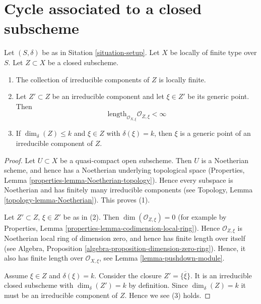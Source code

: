 \section{Cycle associated to a closed subscheme}
\label{section-cycle-of-closed-subscheme}

\begin{lemma}
\label{lemma-multiplicity-finite}
Let $(S, \delta)$ be as in Sitation \ref{situation-setup}.
Let $X$ be locally of finite type over $S$.
Let $Z \subset X$ be a closed subscheme.
\begin{enumerate}
\item The collection of irreducible components of $Z$
is locally finite.
\item Let $Z' \subset Z$ be an irreducible component and
let $\xi \in Z'$ be its generic point.
Then
$$
\text{length}_{\mathcal{O}_{X, \xi}} \mathcal{O}_{Z, \xi} < \infty
$$
\item If $\dim_\delta(Z) \leq k$ and $\xi \in Z$ with
$\delta(\xi) = k$, then $\xi$ is a generic point of an
irreducible component of $Z$.
\end{enumerate}
\end{lemma}

\begin{proof}
Let $U \subset X$ be a quasi-compact open subscheme.
Then $U$ is a Noetherian scheme, and hence has a Noetherian
underlying topological space
(Properties, Lemma \ref{properties-lemma-Noetherian-topology}).
Hence every subspace is Noetherian and
has finitely many irreducible components
(see Topology, Lemma \ref{topology-lemma-Noetherian}).
This proves (1).

\medskip\noindent
Let $Z' \subset Z$, $\xi \in Z'$ be as in (2).
Then $\dim(\mathcal{O}_{Z, \xi}) = 0$ (for example by
Properties, Lemma \ref{properties-lemma-codimension-local-ring}).
Hence $\mathcal{O}_{Z, \xi}$ is Noetherian
local ring of dimension zero, and hence has finite length over
itself (see
Algebra, Proposition \ref{algebra-proposition-dimension-zero-ring}).
Hence, it also has finite length over $\mathcal{O}_{X, \xi}$, see
Lemma \ref{lemma-pushdown-module}.

\medskip\noindent
Assume $\xi \in Z$ and $\delta(\xi) = k$.
Consider the closure $Z' = \overline{\{\xi\}}$. It is an irreducible
closed subscheme with $\dim_\delta(Z') = k$ by definition.
Since $\dim_\delta(Z) = k$ it must be an irreducible component
of $Z$. Hence we see (3) holds.
\end{proof}


